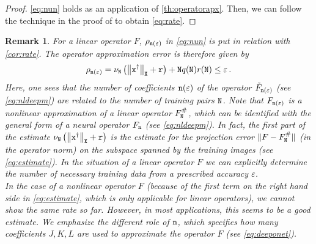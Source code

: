 \documentclass[10pt]{article}
\numberwithin{equation}{section}
\newtheorem{remark}[remark]{Remark}
\theoremstyle{nonumberplain}
\newtheorem{proof}{Proof}
\newcommand{\norm}[1]{\left\|#1\right\|}
\newcommand{\norms}[1]{\|#1\|}
\newcommand{\ve}{\varepsilon}
\newcommand{\X}{{\tt X}}
\newcommand{\n}{{\tt n}}
\newcommand{\x}{{\tt x}}
\newcommand{\xdag}{\x^\dagger}
\newcommand{\no}{{\tt N}}
\begin{document}
\begin{proof}
\autoref{eq:nun} holds as an application of \autoref{th:operatorapx}. Then,  we can follow the technique in the proof of \cite[Theorem 2.3a]{NeuSch90} to obtain \autoref{eq:rate}.

\end{proof}
\begin{remark}
	For a linear operator $F$, $\rho_{\n(\ve)}$ in \autoref{eq:nun} is put in relation with \autoref{cor:rate}. The operator approximation error is therefore given by 
	\begin{equation}\label{eq:auslauf}
	\rho_{\n(\ve)} = \nu_\no \left( \norm{\xdag}_\X + {\tt r} \right) +  \no q(\no) r(\no) \leq \ve\,.
	\end{equation}
	Here, one sees that the number of coefficients $\n(\ve)$ of the operator $\tilde{F}_{\n(\ve)}$ (see \autoref{eq:nldeepm}) are related to the number of training pairs $\no$. Note that $F_{\n(\ve)}$ is a nonlinear approximation of a linear operator $F_{\no}^\#$, which can be identified with the general form of a neural operator $F_{\n}$ (see \autoref{eq:nldeepm}).
	In fact, the first part of the estimate $\nu_\no \left( \norm{\xdag}_\X + {\tt r} \right)$ is the estimate for the projection error $\norms{F-F_\no^\#}$ (in the operator norm) on the subspace spanned by the training images (see \autoref{eq:estimate}). In the situation of a linear operator $F$ we can explicitly determine the number of necessary training data from a prescribed accuracy $\ve$.\\
    In the case of a nonlinear operator $F$ (because of the first term on the right hand side in \autoref{eq:estimate}, which is only applicable for linear operators), we cannot show the same rate so far. However, in most applications, this seems to be a good estimate. We emphasize the different role of $\n$, which specifies how many coefficients $J,K,L$ are used to approximate the operator $F$ (see \autoref{eq:deeponet}).
\end{remark}
\end{document}
